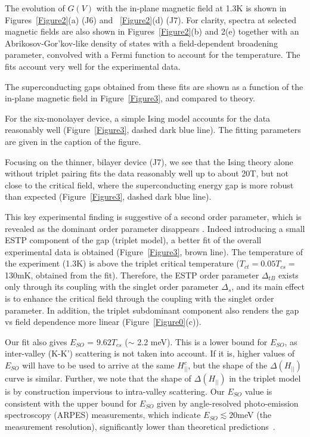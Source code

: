 \documentclass[showpacs,superscriptaddress,preprint,prb]{revtex4}
\begin{document}
The evolution of $G(V)$ with the in-plane magnetic field at 1.3K is shown in Figures~\ref{Figure2}(a) (J6) and ~\ref{Figure2}(d) (J7). For clarity, spectra at selected magnetic fields are also shown in Figures~\ref{Figure2}(b) and 2(e) together with an Abrikosov-Gor'kov-like density of states with a field-dependent broadening parameter\cite{abrikosov,srivastava2008}, convolved with a Fermi function to account for the temperature. The fits account very well for the experimental data. 

The superconducting gaps obtained from these fits are shown as a function of the in-plane magnetic field in Figure~\ref{Figure3}, and compared to theory. 

For the six-monolayer device, a simple Ising model accounts for the data reasonably well (Figure~\ref{Figure3}, dashed dark blue line). The fitting parameters are given in the caption of the figure. 

Focusing on the thinner, bilayer device (J7), we see that the Ising theory alone without triplet pairing 
fits the data reasonably well up to about 20T, but not close to the critical field, where the superconducting energy gap is more robust than expected (Figure~\ref{Figure3}, dashed dark blue line). 

This key experimental finding is suggestive of a second order parameter, which is revealed as the dominant order parameter disappears \cite{rainer1998}. Indeed introducing a small ESTP component of the gap (triplet model), a better fit of the overall experimental data is obtained (Figure~\ref{Figure3}, brown line). The temperature of the experiment (1.3K) is above the triplet critical temperature ($T_{ct}=0.05T_{cs}=$130mK, obtained from the fit). Therefore, the ESTP order parameter $\Delta_{tB}$ exists only through its coupling with the singlet order parameter $\Delta_s$, and its main effect is to enhance the critical field through the coupling with the singlet order parameter. In addition, the triplet subdominant component also renders the gap vs field dependence more linear (Figure~\ref{Figure0}(c)). 


Our fit also gives $E_{SO}$ = $9.62 T_{cs}$ ($\sim$ 2.2 meV). This is a lower bound for $E_{SO}$, as inter-valley (K-K') scattering is not taken into account. If it is, higher values of $E_{SO}$ will have to be used to arrive at the same $H_{||}^c$, but the shape of the $\Delta(H_{||})$ curve is similar. Further, we note that the shape of $\Delta(H_{||})$ in the triplet model is by construction impervious to intra-valley scattering. Our $E_{SO}$ value is consistent with the upper bound for $E_{SO}$ given by angle-resolved photo-emission spectroscopy (ARPES) measurements, which indicate $E_{SO} \lesssim 20$meV (the measurement resolution), significantly lower than theoretical predictions~\cite{xu2018}. 
\end{document}
